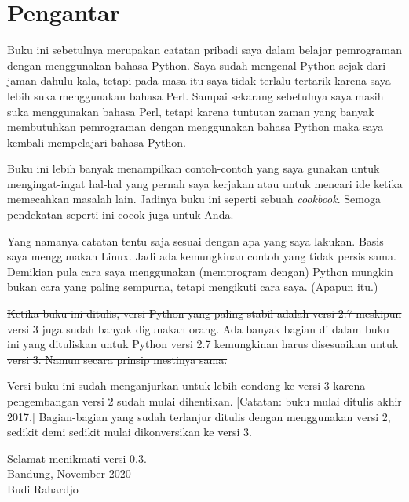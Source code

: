 \chapter*{Pengantar}
Buku ini sebetulnya merupakan catatan pribadi saya dalam belajar pemrograman
dengan menggunakan bahasa Python. Saya sudah mengenal Python sejak dari jaman
dahulu kala, tetapi pada masa itu saya tidak terlalu tertarik karena saya lebih
suka menggunakan bahasa Perl. Sampai sekarang sebetulnya saya masih suka
menggunakan bahasa Perl, tetapi karena tuntutan zaman yang banyak membutuhkan
pemrograman dengan menggunakan bahasa Python maka saya kembali mempelajari
bahasa Python.

Buku ini lebih banyak menampilkan contoh-contoh yang saya gunakan untuk
mengingat-ingat hal-hal yang pernah saya kerjakan atau untuk mencari ide ketika
memecahkan masalah lain. Jadinya buku ini seperti sebuah {\em cookbook}. Semoga
pendekatan seperti ini cocok juga untuk Anda.

Yang namanya catatan tentu saja sesuai dengan apa yang saya lakukan. Basis saya
menggunakan Linux. Jadi ada kemungkinan contoh yang tidak persis sama. Demikian
pula cara saya menggunakan (memprogram dengan) Python mungkin bukan cara yang
paling sempurna, tetapi mengikuti cara saya. (Apapun itu.)

\st{Ketika buku ini ditulis, versi Python yang paling stabil adalah versi 2.7
meskipun versi 3 juga sudah banyak digunakan orang. Ada banyak bagian di dalam
buku ini yang dituliskan untuk Python versi 2.7 kemungkinan harus disesuaikan
untuk versi 3. Namun secara prinsip mestinya sama.} 

Versi buku ini sudah menganjurkan untuk lebih condong ke versi 3
karena pengembangan versi 2 sudah mulai dihentikan.
[Catatan: buku mulai ditulis akhir 2017.]
Bagian-bagian yang sudah terlanjur ditulis dengan menggunakan versi 2,
sedikit demi sedikit mulai dikonversikan ke versi 3.


Selamat menikmati versi 0.3.\\
Bandung, November 2020 \\
Budi Rahardjo
